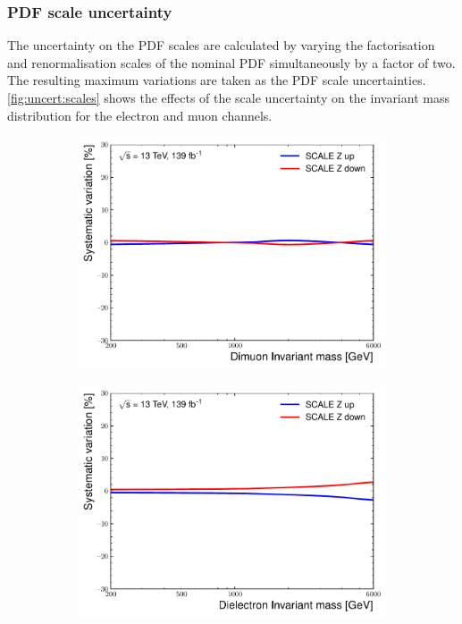 \subsubsection{PDF scale uncertainty}
The uncertainty on the PDF scales are calculated by varying the factorisation and renormalisation scales of the nominal PDF simultaneously by a factor of two. The resulting maximum variations are taken as the PDF scale uncertainties. \cref{fig:uncert:scales} shows the effects of the scale uncertainty on the invariant mass distribution for the electron and muon channels. 

\begin{figure}[h!]
    \centering
    \begin{subfigure}[h]{0.42\textwidth}
        \centering
        \includegraphics[width=\textwidth]{figures/analysis/datamc/Uncertainties/theory/mm/backgroundTemplate_KF_SCALE_Z__1up.pdf}
        \caption{}
        \label{fig:uncert:mmscaleZ}
    \end{subfigure}
    \begin{subfigure}[h]{0.42\textwidth}
        \centering
        \includegraphics[width=\textwidth]{figures/analysis/datamc/Uncertainties/theory/ee/backgroundTemplate_KF_SCALE_Z__1up.pdf}

\end{subfigure}
\end{figure}
